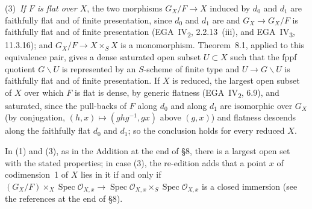 (3)~\emph{If \(F\) is flat over \(X\)}, the two morphisms \(G_X/F\to X\) induced by
\(d_0\) and \(d_1\) are faithfully flat and of finite presentation, since
\(d_0\) and \(d_1\) are and \(G_X\to G_X/F\) is faithfully flat and of finite
presentation (EGA~IV\textsubscript{2}, 2.2.13~(iii), and EGA~IV\textsubscript{3}, 11.3.16);
and \(G_X/F\to X\times_SX\) is a monomorphism. Theorem~8.1, applied to this
equivalence pair, gives a dense saturated open subset \(U\subset X\) such that
the fppf quotient \(G\backslash U\) is represented by an \(S\)-scheme of finite type
and \(U\to G\backslash U\) is faithfully flat and of finite presentation. If \(X\) is
reduced, the largest open subset of \(X\) over which \(F\) is flat is dense, by
generic flatness (EGA~IV\textsubscript{2}, 6.9), and saturated, since the pull-backs
of \(F\) along \(d_0\) and along \(d_1\) are isomorphic over \(G_X\) (by
conjugation, \((h,x)\mapsto(ghg^{-1},gx)\) above \((g,x)\)) and flatness descends
along the faithfully flat \(d_0\) and \(d_1\); so the conclusion holds for every
reduced \(X\).

In (1) and (3), as in the Addition at the end of \S8, there is a largest
open set with the stated properties; in case (3), the re-edition adds that
a point \(x\) of codimension~1 of \(X\) lies in it if and only if
\((G_X/F)\times_X\operatorname{Spec}\mathcal O_{X,x}\to
\operatorname{Spec}\mathcal O_{X,x}\times_S\operatorname{Spec}\mathcal O_{X,x}\) is a
closed immersion (see the references at the end of \S8).
\par\medskip

